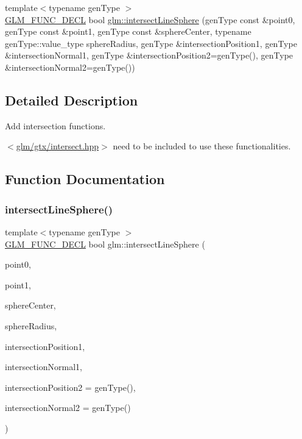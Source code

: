 \begin{DoxyCompactItemize}
\item 
{\footnotesize template$<$typename gen\+Type $>$ }\\\hyperlink{setup_8hpp_ab2d052de21a70539923e9bcbf6e83a51}{G\+L\+M\+\_\+\+F\+U\+N\+C\+\_\+\+D\+E\+CL} bool \hyperlink{group__gtx__intersect_ga9c68139f3d8a4f3d7fe45f9dbc0de5b7}{glm\+::intersect\+Line\+Sphere} (gen\+Type const \&point0, gen\+Type const \&point1, gen\+Type const \&sphere\+Center, typename gen\+Type\+::value\+\_\+type sphere\+Radius, gen\+Type \&intersection\+Position1, gen\+Type \&intersection\+Normal1, gen\+Type \&intersection\+Position2=gen\+Type(), gen\+Type \&intersection\+Normal2=gen\+Type())
\end{DoxyCompactItemize}


\subsection{Detailed Description}
Add intersection functions. 

$<$\hyperlink{intersect_8hpp}{glm/gtx/intersect.\+hpp}$>$ need to be included to use these functionalities. 

\subsection{Function Documentation}
\mbox{\label{group__gtx__intersect_ga9c68139f3d8a4f3d7fe45f9dbc0de5b7}} 
\subsubsection{\texorpdfstring{intersect\+Line\+Sphere()}{intersectLineSphere()}}
{\footnotesize\ttfamily template$<$typename gen\+Type $>$ \\
\hyperlink{setup_8hpp_ab2d052de21a70539923e9bcbf6e83a51}{G\+L\+M\+\_\+\+F\+U\+N\+C\+\_\+\+D\+E\+CL} bool glm\+::intersect\+Line\+Sphere (\begin{DoxyParamCaption}\item[{gen\+Type const \&}]{point0,  }\item[{gen\+Type const \&}]{point1,  }\item[{gen\+Type const \&}]{sphere\+Center,  }\item[{typename gen\+Type\+::value\+\_\+type}]{sphere\+Radius,  }\item[{gen\+Type \&}]{intersection\+Position1,  }\item[{gen\+Type \&}]{intersection\+Normal1,  }\item[{gen\+Type \&}]{intersection\+Position2 = {\ttfamily genType()},  }\item[{gen\+Type \&}]{intersection\+Normal2 = {\ttfamily genType()} }\end{DoxyParamCaption})}

